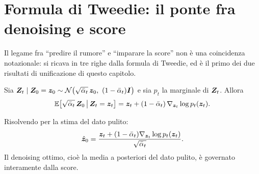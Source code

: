 \section{Formula di Tweedie: il ponte fra denoising e score}

Il legame fra ``predire il rumore'' e ``imparare la score'' non è una coincidenza notazionale: si ricava in tre righe dalla formula di Tweedie, ed è il primo dei due risultati di unificazione di questo capitolo.

\begin{theorem}[Tweedie]
Sia $\vect{Z}_t \mid \vect{Z}_0 = \vect{z}_0 \sim \mathcal{N}\big(\sqrt{\bar\alpha_t}\,\vect{z}_0,\ (1-\bar\alpha_t)\mat{I}\big)$ e sia $p_t$ la marginale di $\bm{Z}_t$. Allora
\[
\mathbb{E}\big[\sqrt{\bar\alpha_t}\, \bm{Z}_0 \,\big|\, \bm{Z}_t = \bm{z}_t\big] = \bm{z}_t + (1-\bar\alpha_t)\, \nabla_{\bm{z}_t} \log p_t(\bm{z}_t).
\]
\end{theorem}

Risolvendo per la stima del dato pulito:
\[
\hat{\bm{z}}_0 = \frac{\bm{z}_t + (1-\bar\alpha_t)\nabla_{\bm{z}_t}\log p_t(\bm{z}_t)}{\sqrt{\bar\alpha_t}}.
\]
Il denoising ottimo, cioè la media a posteriori del dato pulito, è governato interamente dalla score.

